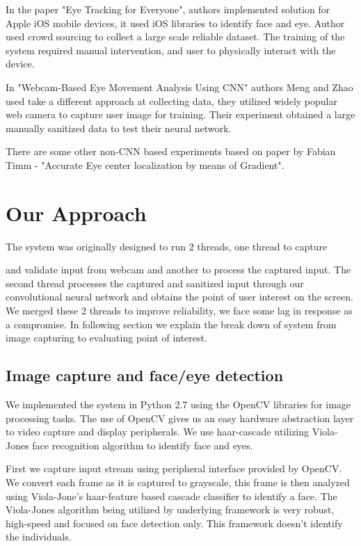 \documentclass[10pt,twocolumn,letterpaper]{article}
\begin{document}
In the paper "Eye Tracking for Everyone", authors implemented solution for Apple iOS mobile devices, it used iOS libraries to identify face and eye. Author used crowd sourcing to collect a large scale reliable dataset. The training of the system required manual intervention, and user to physically interact with the device. 

In "Webcam-Based Eye Movement Analysis Using CNN" authors Meng and Zhao used take a different approach at collecting data, they utilized widely popular web camera to capture user image for training. Their experiment obtained a large manually sanitized data to test their neural network. 

There are some other non-CNN based experiments based on paper by Fabian Timm - "Accurate Eye center localization by means of Gradient". 

\section{Our Approach}
The system was originally  designed to run 2 threads, one thread to capture 


and validate input from webcam and another to process the 
captured input. The second thread processes the captured and 
sanitized input through our convolutional neural network and 
obtains the point of user interest on the screen. We merged these 2 threads to improve reliability, we face some lag in response as a compromise. In following section we explain the break down of system from image capturing  to evaluating point of interest.  



\subsection{Image capture and face/eye detection}

We implemented the system in Python 2.7 using the OpenCV libraries for 
image processing tasks. The use of OpenCV gives us an easy hardware 
abstraction layer to video capture and display peripherals. We use 
haar-cascade utilizing Viola-Jones face recognition algorithm to 
identify face and eyes. 

First we capture input stream using peripheral
interface provided by OpenCV. We convert each 
frame as it is captured to grayscale, this frame is then analyzed 
using Viola-Jone's haar-feature based cascade classifier to identify a face.  
The Viola-Jones algorithm being utilized by underlying framework is very robust, 
high-speed and focused on face detection only. This framework doesn't 
identify the individuals. 
\end{document}
